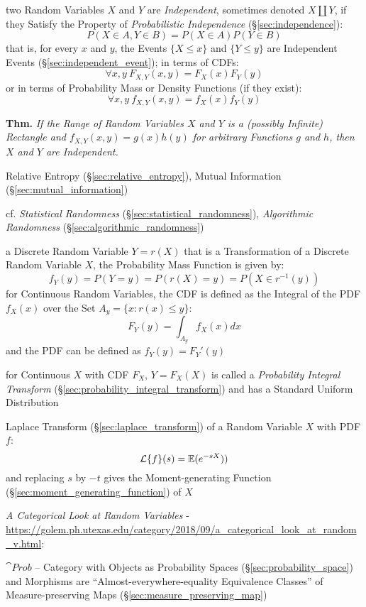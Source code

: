 two Random Variables $X$ and $Y$ are \emph{Independent}, sometimes denoted
$X \coprod Y$, if they Satisfy the Property of \emph{Probabilistic Independence}
(\S\ref{sec:independence}):
\[
  P(X \in A, Y \in B) = P(X \in A) P(Y \in B)
\]
that is, for every $x$ and $y$, the Events $\{X \leq x\}$ and $\{Y \leq y\}$ are
Independent Events (\S\ref{sec:independent_event}); in terms of CDFs:
\[
  \forall x,y\ F_{X,Y}(x,y) = F_X(x)F_Y(y)
\]
or in terms of Probability Mass or Density Functions (if they exist):
\[
  \forall x,y\ f_{X,Y}(x,y) = f_X(x)f_Y(y)
\]

\textbf{Thm.} \emph{If the Range of Random Variables $X$ and $Y$ is a (possibly
  Infinite) Rectangle and $f_{X,Y}(x,y) = g(x)h(y)$ for arbitrary Functions $g$
  and $h$, then $X$ and $Y$ are Independent.}

\fist Relative Entropy (\S\ref{sec:relative_entropy}), Mutual Information
(\S\ref{sec:mutual_information})

cf. \emph{Statistical Randomness} (\S\ref{sec:statistical_randomness}),
\emph{Algorithmic Randomness} (\S\ref{sec:algorithmic_randomness})

a Discrete Random Variable $Y = r(X)$ that is a Transformation of a Discrete
Random Variable $X$, the Probability Mass Function is given by:
\[
  f_Y(y) = P(Y = y) = P(r(X) = y) = P(X \in r^{-1}(y))
\]
for Continuous Random Variables, the CDF is defined as the Integral of the PDF
$f_X(x)$ over the Set $A_y = \{x : r(x) \leq y\}$:
\[
  F_Y(y) = \int_{A_y} f_X(x) dx
\]
and the PDF can be defined as $f_Y(y) = F_Y'(y)$

for Continuous $X$ with CDF $F_X$, $Y = F_X(X)$ is called a \emph{Probability
  Integral Transform} (\S\ref{sec:probability_integral_transform}) and has a
Standard Uniform Distribution

Laplace Transform (\S\ref{sec:laplace_transform}) of a Random Variable $X$ with
PDF $f$:
\[
  \mathcal{L}\{f\}(s) = \mathbb{E}(e^{-sX}))
\]
and replacing $s$ by $-t$ gives the Moment-generating Function
(\S\ref{sec:moment_generating_function}) of $X$

\asterism

\emph{A Categorical Look at Random Variables} -
\url{https://golem.ph.utexas.edu/category/2018/09/a_categorical_look_at_random_v.html}:

$\cat{Prob}$ -- Category with Objects as Probability Spaces
(\S\ref{sec:probability_space}) and Morphisms are ``Almost-everywhere-equality
Equivalence Classes'' of Measure-preserving Maps
(\S\ref{sec:measure_preserving_map})

